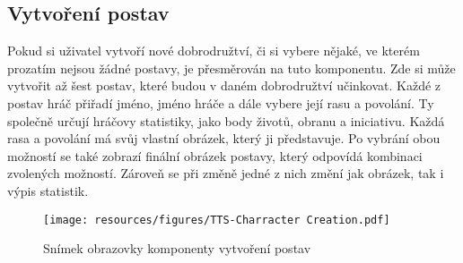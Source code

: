 \subsection{Vytvoření postav}
Pokud si uživatel vytvoří nové dobrodružtví, či si vybere nějaké, ve kterém prozatím nejsou žádné postavy, je přesměrován na tuto komponentu. Zde si může vytvořit až šest postav, které budou v daném dobrodružtví učinkovat. Každé z postav hráč přiřadí jméno, jméno hráče a dále vybere její rasu a povolání. Ty společně určují hráčovy statistiky, jako body životů, obranu a iniciativu. Každá rasa a povolání má svůj vlastní obrázek, který ji představuje. Po vybrání obou možností se také zobrazí finální obrázek postavy, který odpovídá kombinaci zvolených možností. Zároveň se při změně jedné z nich změní jak obrázek, tak i výpis statistik.

\begin{figure}[htbp]
  \centering
  \texttt{[image: resources/figures/TTS-Charracter Creation.pdf]}
  \caption{Snímek obrazovky komponenty vytvoření postav}
  \label{fig:pdf}
\end{figure}
